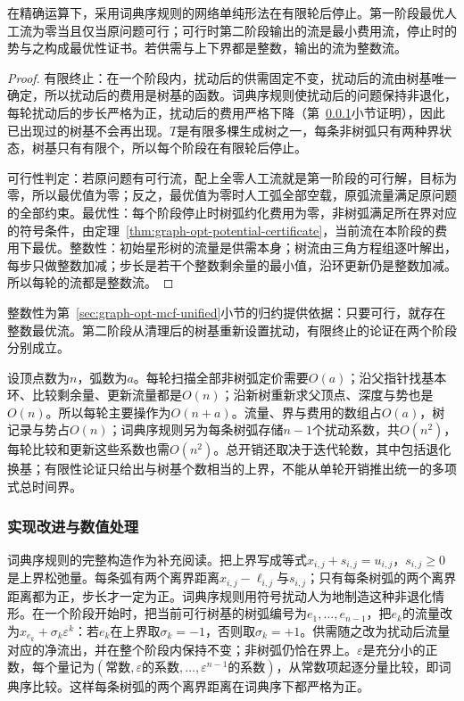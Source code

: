 \begin{theorem}[网络单纯形法的正确性]
\label{thm:graph-opt-network-simplex}
在精确运算下，采用词典序规则的网络单纯形法在有限轮后停止。第一阶段最优人工流为零当且仅当原问题可行；可行时第二阶段输出的流是最小费用流，停止时的势与之构成最优性证书。若供需与上下界都是整数，输出的流为整数流。
\end{theorem}

\begin{proof}
有限终止：在一个阶段内，扰动后的供需固定不变，扰动后的流由树基唯一确定，所以扰动后的费用是树基的函数。词典序规则使扰动后的问题保持非退化，每轮扰动后的步长严格为正，扰动后的费用严格下降（第~\ref{sec:graph-opt-ns-improvements}小节证明），因此已出现过的树基不会再出现。$T$是有限多棵生成树之一，每条非树弧只有两种界状态，树基只有有限个，所以每个阶段在有限轮后停止。

可行性判定：若原问题有可行流，配上全零人工流就是第一阶段的可行解，目标为零，所以最优值为零；反之，最优值为零时人工弧全部空载，原弧流量满足原问题的全部约束。最优性：每个阶段停止时树弧约化费用为零，非树弧满足所在界对应的符号条件，由定理~\ref{thm:graph-opt-potential-certificate}，当前流在本阶段的费用下最优。整数性：初始星形树的流量是供需本身；树流由三角方程组逐叶解出，每步只做整数加减；步长是若干个整数剩余量的最小值，沿环更新仍是整数加减。所以每轮的流都是整数流。
\end{proof}

整数性为第~\ref{sec:graph-opt-mcf-unified}小节的归约提供依据：只要可行，就存在整数最优流。第二阶段从清理后的树基重新设置扰动，有限终止的论证在两个阶段分别成立。

设顶点数为$n$，弧数为$a$。每轮扫描全部非树弧定价需要$O(a)$；沿父指针找基本环、比较剩余量、更新流量都是$O(n)$；沿新树重新求父顶点、深度与势也是$O(n)$。所以每轮主要操作为$O(n+a)$。流量、界与费用的数组占$O(a)$，树记录与势占$O(n)$；词典序规则另为每条树弧存储$n-1$个扰动系数，共$O(n^2)$，每轮比较和更新这些系数也需$O(n^2)$。总开销还取决于迭代轮数，其中包括退化换基；有限性论证只给出与树基个数相当的上界，不能从单轮开销推出统一的多项式总时间界。

\subsubsection{实现改进与数值处理}
\label{sec:graph-opt-ns-improvements}

词典序规则的完整构造作为补充阅读。把上界写成等式$x_{i,j}+s_{i,j}=u_{i,j}$，$s_{i,j}\geq0$是上界松弛量。每条弧有两个离界距离$x_{i,j}-\ell_{i,j}$与$s_{i,j}$；只有每条树弧的两个离界距离都为正，步长才一定为正。词典序规则用符号扰动人为地制造这种非退化情形。在一个阶段开始时，把当前可行树基的树弧编号为$e_1,\ldots,e_{n-1}$，把$e_k$的流量改为$x_{e_k}+\sigma_k\varepsilon^k$：若$e_k$在上界取$\sigma_k=-1$，否则取$\sigma_k=+1$。供需随之改为扰动后流量对应的净流出，并在整个阶段内保持不变；非树弧仍恰在界上。$\varepsilon$是充分小的正数，每个量记为$(\text{常数},\varepsilon\text{的系数},\ldots,\varepsilon^{n-1}\text{的系数})$，从常数项起逐分量比较，即词典序比较。这样每条树弧的两个离界距离在词典序下都严格为正。

